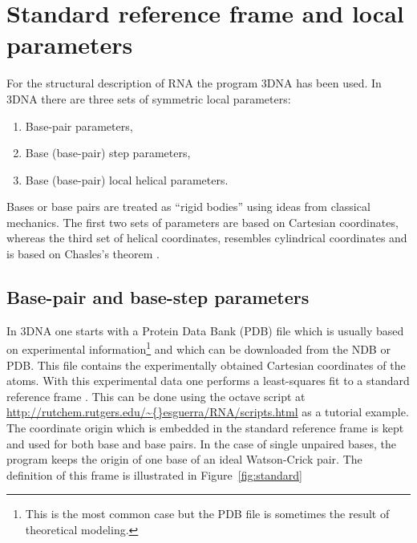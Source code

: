 \chapter{Standard reference frame and local parameters}
\label{appendix_1a}

For  the  structural  description  of RNA  the  program  \textsf{3DNA}
\cite{lu2003} has been used.  In \textsf{3DNA} there are three sets of
symmetric local parameters:
\begin{enumerate}
\item Base-pair parameters,
\item Base (base-pair) step parameters,
\item Base (base-pair) local helical parameters.
\end{enumerate}
Bases or base  pairs are treated as ``rigid  bodies'' using ideas from
classical mechanics.
The first two  sets of parameters are based  on Cartesian coordinates,
whereas the  third set  of helical coordinates,  resembles cylindrical
coordinates and is based on Chasles's theorem \cite{babcock1994}.

\section{Base-pair and base-step parameters}
In  \textsf{3DNA}   one  starts  with   a  Protein  Data   Bank  (PDB)
\cite{berman2000}  file   which  is  usually   based  on  experimental
information\footnote{This is the most common  case but the PDB file is
  sometimes  the result of  theoretical modeling.}   and which  can be
downloaded from the NDB or  PDB. This file contains the experimentally
obtained Cartesian  coordinates of  the atoms. With  this experimental
data one  performs a least-squares  fit to a standard  reference frame
\cite{olson2001}. This can be done using the \textsf{octave} script at
\url{http://rutchem.rutgers.edu/\~{}esguerra/RNA/scripts.html}   as  a
tutorial  example.  The  coordinate origin  which is  embedded  in the
standard  reference frame  is kept  and used  for both  base  and base
pairs.  In  the case of single  unpaired bases, the  program keeps the
origin of one  base of an ideal Watson-Crick  pair.  The definition of
this frame is illustrated in Figure~\ref{fig:standard}

